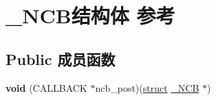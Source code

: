 \hypertarget{struct___n_c_b}{}\section{\+\_\+\+N\+C\+B结构体 参考}
\label{struct___n_c_b}
\subsection*{Public 成员函数}
\begin{DoxyCompactItemize}
\item 
\mbox{\label{struct___n_c_b_a3fc4e35b8c7c0b185cdc2c60f0bcf6df}} 
{\bfseries void} (C\+A\+L\+L\+B\+A\+CK $\ast$ncb\+\_\+post)(\hyperlink{interfacestruct}{struct} \hyperlink{struct___n_c_b}{\+\_\+\+N\+CB} $\ast$)
\end{DoxyCompactItemize}
